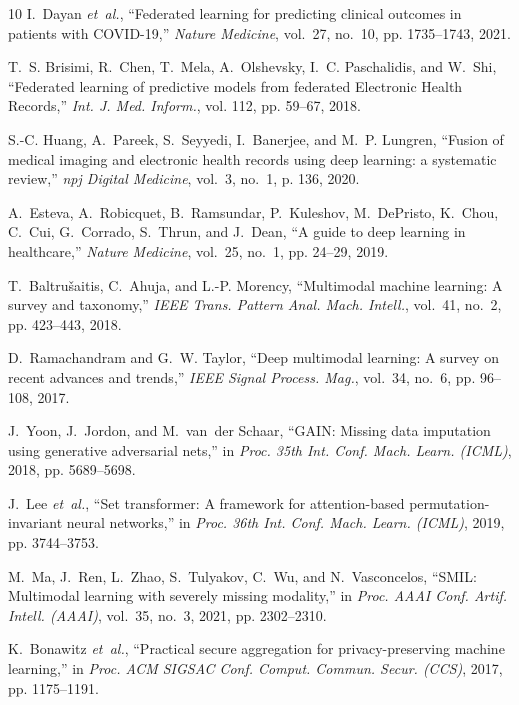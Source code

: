 \documentclass[10pt,conference]{IEEEtran}
\begin{document}
\begin{thebibliography}{10}
I.~Dayan \emph{et~al.}, ``Federated learning for predicting clinical outcomes in patients with COVID-19,'' \emph{Nature Medicine}, vol.~27, no.~10, pp. 1735--1743, 2021.

T.~S. Brisimi, R.~Chen, T.~Mela, A.~Olshevsky, I.~C. Paschalidis, and W.~Shi, ``Federated learning of predictive models from federated Electronic Health Records,'' \emph{Int. J. Med. Inform.}, vol. 112, pp. 59--67, 2018.

S.-C. Huang, A.~Pareek, S.~Seyyedi, I.~Banerjee, and M.~P. Lungren, ``Fusion of medical imaging and electronic health records using deep learning: a systematic review,'' \emph{npj Digital Medicine}, vol.~3, no.~1, p. 136, 2020.

A.~Esteva, A.~Robicquet, B.~Ramsundar, P.~Kuleshov, M.~DePristo, K.~Chou, C.~Cui, G.~Corrado, S.~Thrun, and J.~Dean, ``A guide to deep learning in healthcare,'' \emph{Nature Medicine}, vol.~25, no.~1, pp. 24--29, 2019.

T.~Baltru{\v{s}}aitis, C.~Ahuja, and L.-P. Morency, ``Multimodal machine learning: A survey and taxonomy,'' \emph{IEEE Trans. Pattern Anal. Mach. Intell.}, vol.~41, no.~2, pp. 423--443, 2018.

D.~Ramachandram and G.~W. Taylor, ``Deep multimodal learning: A survey on recent advances and trends,'' \emph{IEEE Signal Process. Mag.}, vol.~34, no.~6, pp. 96--108, 2017.

J.~Yoon, J.~Jordon, and M.~van~der Schaar, ``GAIN: Missing data imputation using generative adversarial nets,'' in \emph{Proc. 35th Int. Conf. Mach. Learn. (ICML)}, 2018, pp. 5689--5698.

J.~Lee \emph{et~al.}, ``Set transformer: A framework for attention-based permutation-invariant neural networks,'' in \emph{Proc. 36th Int. Conf. Mach. Learn. (ICML)}, 2019, pp. 3744--3753.

M.~Ma, J.~Ren, L.~Zhao, S.~Tulyakov, C.~Wu, and N.~Vasconcelos, ``SMIL: Multimodal learning with severely missing modality,'' in \emph{Proc. AAAI Conf. Artif. Intell. (AAAI)}, vol.~35, no.~3, 2021, pp. 2302--2310.

K.~Bonawitz \emph{et~al.}, ``Practical secure aggregation for privacy-preserving machine learning,'' in \emph{Proc. ACM SIGSAC Conf. Comput. Commun. Secur. (CCS)}, 2017, pp. 1175--1191.

\end{thebibliography}
\end{document}
